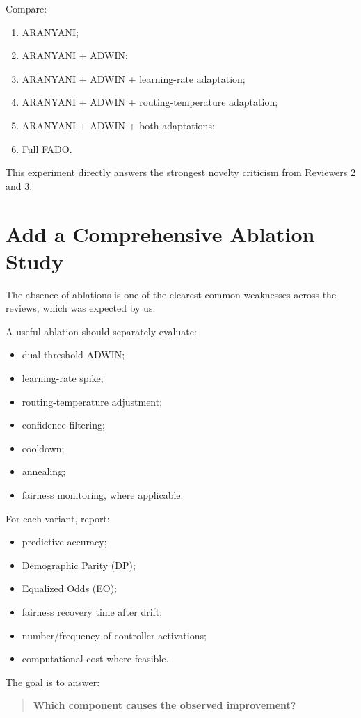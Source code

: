 \documentclass[11pt,a4paper]{article}
\begin{document}
Compare:
\begin{enumerate}[leftmargin=*]
  \item ARANYANI;
  \item ARANYANI + ADWIN;
  \item ARANYANI + ADWIN + learning-rate adaptation;
  \item ARANYANI + ADWIN + routing-temperature adaptation;
  \item ARANYANI + ADWIN + both adaptations;
  \item Full FADO.
\end{enumerate}

This experiment directly answers the strongest novelty criticism from
Reviewers 2 and 3.

\section{Add a Comprehensive Ablation Study}

The absence of ablations is one of the clearest common weaknesses
across the reviews, which was expected by us.

A useful ablation should separately evaluate:
\begin{itemize}[leftmargin=*]
  \item dual-threshold ADWIN;
  \item learning-rate spike;
  \item routing-temperature adjustment;
  \item confidence filtering;
  \item cooldown;
  \item annealing;
  \item fairness monitoring, where applicable.
\end{itemize}

For each variant, report:
\begin{itemize}[leftmargin=*]
  \item predictive accuracy;
  \item Demographic Parity (DP);
  \item Equalized Odds (EO);
  \item fairness recovery time after drift;
  \item number/frequency of controller activations;
  \item computational cost where feasible.
\end{itemize}

The goal is to answer:
\begin{quote}
  \textbf{Which component causes the observed improvement?}
\end{quote}
\end{document}

